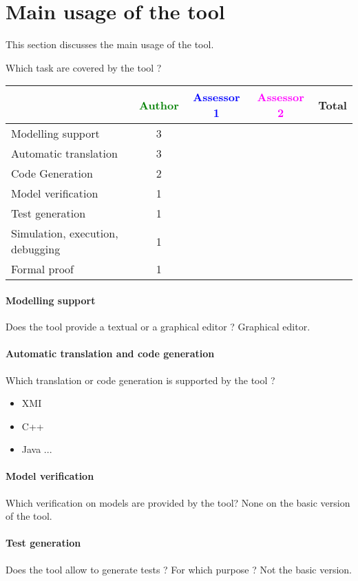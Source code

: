 \section{Main usage of the tool}
\label{main_usage}

This section discusses the main usage of the tool.

Which task are covered by the tool ?


\begin{tabular}{|l | c | c | c | c|}
\hline
& \textcolor{green}{Author} & \textcolor{blue}{Assessor 1} & \textcolor{magenta}{Assessor 2} & Total \\
\hline 
Modelling support &3 & & &  \\
\hline
Automatic translation  &3 & & & \\
\hline
Code Generation  &2 & & & \\
\hline
Model verification &1 & & & \\
\hline
Test generation &1 & & & \\
\hline
Simulation, execution, debugging &1 & & & \\
\hline
Formal proof &1 & & & \\
\hline
\end{tabular}

\paragraph{Modelling support}
Does the tool provide a  textual or a graphical editor ? Graphical editor.

\paragraph{Automatic translation and code generation}
Which translation or code generation is supported by the tool ?
\begin{itemize}
\item XMI
\item C++
\item Java ...
\end{itemize}
\paragraph{Model verification}
Which verification on models are provided by the tool?
None on the basic version of the tool.
\paragraph{Test generation}
Does the tool allow to generate tests ? For  which purpose ?
Not the basic version.
